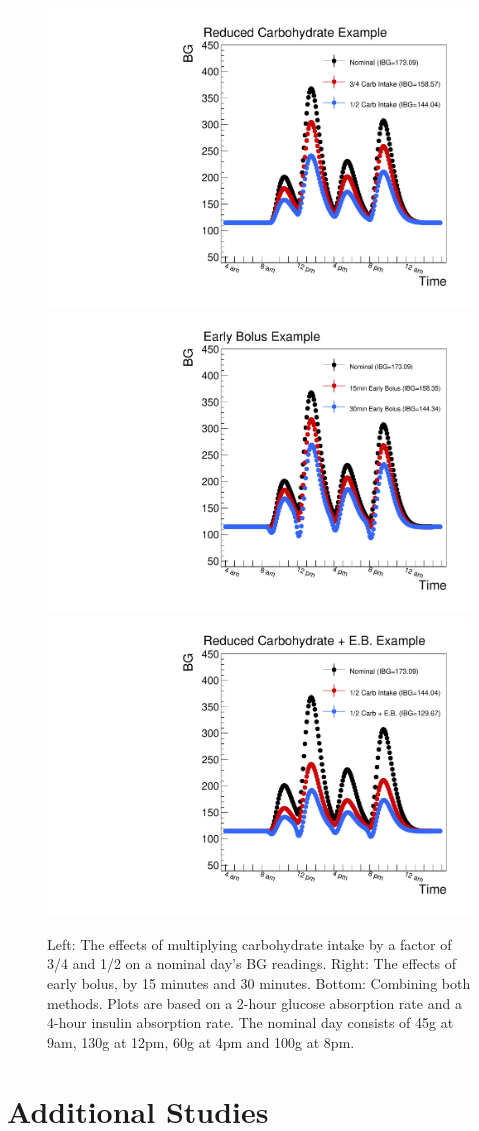 \begin{figure}[htbp]
\begin{center}
\includegraphics[width=3.in]{figures/reduced_carb.pdf}
\includegraphics[width=3.in]{figures/early_bolus.pdf}
\includegraphics[width=3.in]{figures/reduced_carb_eb.pdf}
\caption{Left: The effects of multiplying carbohydrate intake by a factor of 3/4 and 1/2 on a 
nominal day's BG readings. 
Right: The effects of early bolus, by 15 minutes and 30 minutes. Bottom: Combining both methods. 
Plots are based on a 2-hour glucose absorption rate and a 4-hour insulin absorption rate.
The nominal day consists of 45g at 9am, 130g at 12pm, 60g at 4pm and 100g at 8pm. }
\label{fig:reduceCarb_eb}
\end{center}
\end{figure}


\section{Additional Studies}

